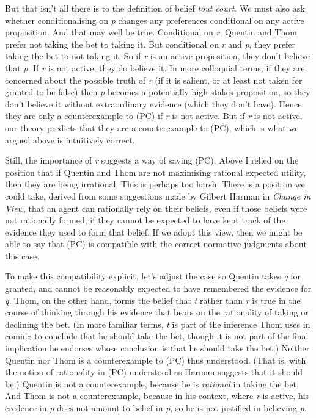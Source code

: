 \documentclass[
  11pt,
  letterpaper,
  DIV=11,
  numbers=noendperiod,
  twoside]{scrartcl}
\begin{document}
But that isn't all there is to the definition of belief \emph{tout
court}. We must also ask whether conditionalising on \emph{p} changes
any preferences conditional on any active proposition. And that may well
be true. Conditional on \emph{r}, Quentin and Thom prefer not taking the
bet to taking it. But conditional on \emph{r} and \emph{p}, they prefer
taking the bet to not taking it. So if \emph{r} is an active
proposition, they don't believe that \emph{p}. If \emph{r} is not
active, they do believe it. In more colloquial terms, if they are
concerned about the possible truth of \emph{r} (if it is salient, or at
least not taken for granted to be false) then \emph{p} becomes a
potentially high-stakes proposition, so they don't believe it without
extraordinary evidence (which they don't have). Hence they are only a
counterexample to (PC) if \emph{r} is not active. But if \emph{r} is not
active, our theory predicts that they are a counterexample to (PC),
which is what we argued above is intuitively correct.

Still, the importance of \emph{r} suggests a way of saving (PC). Above I
relied on the position that if Quentin and Thom are not maximising
rational expected utility, then they are being irrational. This is
perhaps too harsh. There is a position we could take, derived from some
suggestions made by Gilbert Harman in \emph{Change in View}, that an
agent can rationally rely on their beliefs, even if those beliefs were
not rationally formed, if they cannot be expected to have kept track of
the evidence they used to form that belief. If we adopt this view, then
we might be able to say that (PC) is compatible with the correct
normative judgments about this case.

To make this compatibility explicit, let's adjust the case so Quentin
takes \emph{q} for granted, and cannot be reasonably expected to have
remembered the evidence for \emph{q}. Thom, on the other hand, forms the
belief that \emph{t} rather than \emph{r} is true in the course of
thinking through his evidence that bears on the rationality of taking or
declining the bet. (In more familiar terms, \emph{t} is part of the
inference Thom uses in coming to conclude that he should take the bet,
though it is not part of the final implication he endorses whose
conclusion is that he should take the bet.) Neither Quentin nor Thom is
a counterexample to (PC) thus understood. (That is, with the notion of
rationality in (PC) understood as Harman suggests that it should be.)
Quentin is not a counterexample, because he is \emph{rational} in taking
the bet. And Thom is not a counterexample, because in his context, where
\emph{r} is active, his credence in \emph{p} does not amount to belief
in \emph{p}, so he is not justified in believing \emph{p}.
\end{document}
